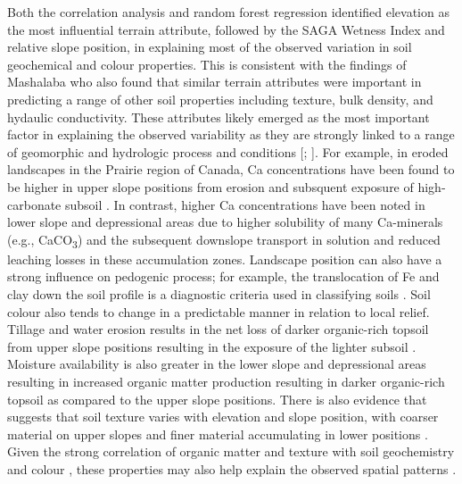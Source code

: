 \documentclass[
  number]{elsarticle}
\begin{document}
Both the correlation analysis and random forest regression identified
elevation as the most influential terrain attribute, followed by the
SAGA Wetness Index and relative slope position, in explaining most of
the observed variation in soil geochemical and colour properties. This
is consistent with the findings of Mashalaba \citep{mashalaba2020} who
also found that similar terrain attributes were important in predicting
a range of other soil properties including texture, bulk density, and
hydaulic conductivity. These attributes likely emerged as the most
important factor in explaining the observed variability as they are
strongly linked to a range of geomorphic and hydrologic process and
conditions {[}\citep{mello2022}; \citep{libohova2024}{]}. For example,
in eroded landscapes in the Prairie region of Canada, Ca concentrations
have been found to be higher in upper slope positions from erosion and
subsquent exposure of high-carbonate subsoil \citep{papiernik2005}. In
contrast, higher Ca concentrations have been noted in lower slope and
depressional areas due to higher solubility of many Ca-minerals (e.g.,
CaCO\textsubscript{3}) and the subsequent downslope transport in
solution and reduced leaching losses in these accumulation zones.
Landscape position can also have a strong influence on pedogenic
process; for example, the translocation of Fe and clay down the soil
profile is a diagnostic criteria used in classifying soils
\citep{stonehouse1971}. Soil colour also tends to change in a
predictable manner in relation to local relief. Tillage and water
erosion results in the net loss of darker organic-rich topsoil from
upper slope positions resulting in the exposure of the lighter subsoil
\citep{papiernik2005}. Moisture availability is also greater in the
lower slope and depressional areas resulting in increased organic matter
production resulting in darker organic-rich topsoil as compared to the
upper slope positions. There is also evidence that suggests that soil
texture varies with elevation and slope position, with coarser material
on upper slopes and finer material accumulating in lower positions
\citep{kokulan2018, cox2003}. Given the strong correlation of organic
matter and texture with soil geochemistry \citep{horowitz1991} and
colour \citep{viscarrarossel2009}, these properties may also help
explain the observed spatial patterns .
\end{document}

